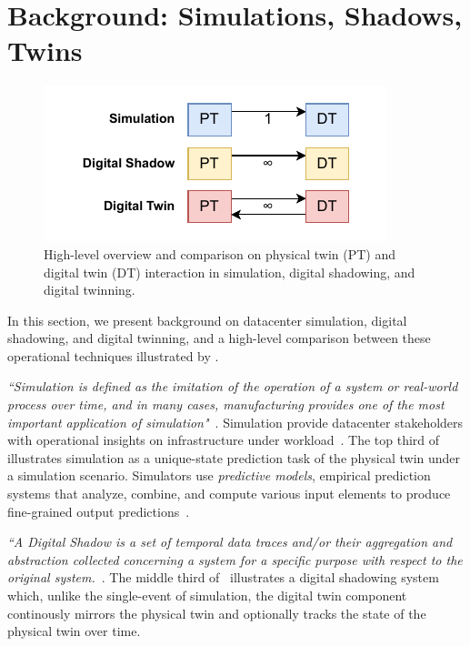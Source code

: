 \section{Background: Simulations, Shadows, Twins}\label{sec:background}

\begin{figure}
    \centering
    \includegraphics[width=0.75\linewidth]{report/figures/background.pdf}
    \caption{High-level overview and comparison on physical twin (PT) and digital twin (DT) interaction in simulation, digital shadowing, and digital twinning.}
    \label{fig:background}
\end{figure}

In this section, we present background on datacenter simulation, digital shadowing, and digital twinning, and a high-level comparison between these operational techniques illustrated by .

\textit{``Simulation is defined as the imitation of the operation of a system or real-world process over time, and in many cases, manufacturing provides one of the most important application of simulation"}~\cite{DBLP:conf/wsc/LeeMS03, nicolae5377101m3sa}. Simulation provide datacenter stakeholders with operational insights on infrastructure under workload~\cite{nicolae5377101m3sa}. The top third of~ illustrates simulation as a unique-state prediction task of the physical twin under a simulation scenario. Simulators use \textit{predictive models}, empirical prediction systems that analyze, combine, and compute various input elements to produce fine-grained output predictions~\cite{modsim:book/ZaraiN15:orig, nicolae5377101m3sa}.

\textit{``A Digital Shadow is a set of temporal data traces and/or their aggregation and abstraction collected concerning a system for a specific purpose with respect to the original system.}~\cite{Braun2023_DigitalShadowDefinition}. The middle third of~ illustrates a digital shadowing system which, unlike the single-event of simulation, the digital twin component continously mirrors the physical twin and optionally tracks the state of the physical twin over time.


